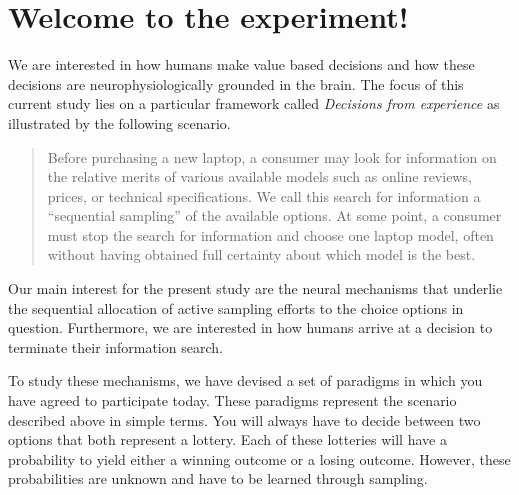 \documentclass[12pt, oneside]{scrartcl}
\begin{document}
\section{Welcome to the experiment!}

We are interested in how humans make value based decisions and how these decisions are neurophysiologically grounded in the brain. The focus of this current study lies on a particular framework called \textit{Decisions from experience} as illustrated by the following scenario.

\begin{quotation}
\noindent Before purchasing a new laptop, a consumer may look for information on the relative merits of various available models such as online reviews, prices, or technical specifications. We call this search for information a “sequential sampling” of the available options. At some point, a consumer must stop the search for information and choose one laptop model, often without having obtained full certainty about which model is the best.
\end{quotation}


Our main interest for the present study are the neural mechanisms that underlie the sequential allocation of active sampling efforts to the choice options in question. Furthermore, we are interested in how humans arrive at a decision to terminate their information search. \vspace{\baselineskip}

To study these mechanisms, we have devised a set of paradigms in which you have agreed to participate today. These paradigms represent the scenario described above in simple terms. You will always have to decide between two options that both represent a lottery. Each of these lotteries will have a probability to yield either a winning outcome or a losing outcome. However, these probabilities are unknown and have to be learned through sampling. \vspace{\baselineskip}
\end{document}
